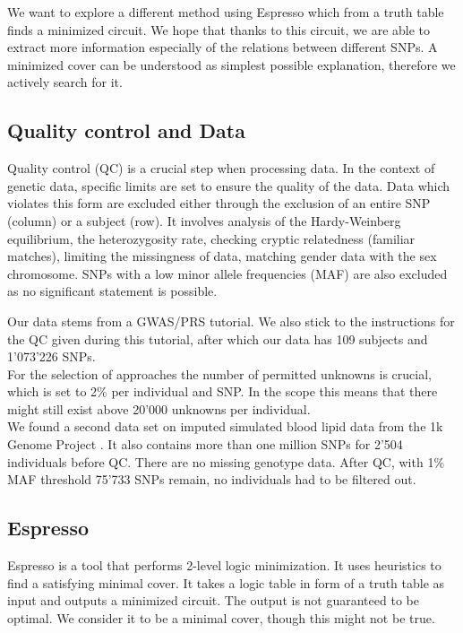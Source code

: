 \documentclass[letterpaper, 11pt]{article}
\begin{document}
We want to explore a different method using Espresso which from a truth table finds a minimized circuit. We hope that thanks to this circuit, we are able to extract more information especially of the relations between different SNPs. A minimized cover can be understood as simplest possible explanation, therefore we actively search for it. 

\subsection {Quality control and Data}
Quality control (QC) is a crucial step when processing data. In the context of genetic data, specific limits are set to ensure the quality of the data. Data which violates this form are excluded either through the exclusion of an entire SNP (column) or a subject (row). It involves analysis of the Hardy-Weinberg equilibrium, the heterozygosity rate, checking cryptic relatedness (familiar matches), limiting the missingness of data, matching gender data with the sex chromosome. SNPs with a low minor allele frequencies (MAF) are also excluded as no significant statement is possible. 

Our data stems from a GWAS/PRS tutorial\cite{tutorial}. We also stick to the instructions for the QC given during this tutorial, after which our data has 109 subjects and 1'073'226 SNPs.  \\

For the selection of approaches the number of permitted unknowns is crucial, which is set to 2\% per individual and SNP. In the scope this means that there might still exist above 20'000 unknowns per individual. \\

We found a second data set on imputed simulated blood lipid data from the 1k Genome Project \cite{1k}. It also contains more than one million SNPs for 2'504 individuals before QC. There are no missing genotype data. After QC, with 1\% MAF threshold 75'733 SNPs remain, no individuals had to be filtered out.\\

\subsection{Espresso}
Espresso is a tool that performs 2-level logic minimization. It uses heuristics to find a satisfying minimal cover. It takes a logic table in form of a truth table as input and outputs a minimized circuit.  The output is not guaranteed to be optimal. We consider it to be a minimal cover, though this might not be true. \\
\end{document}
